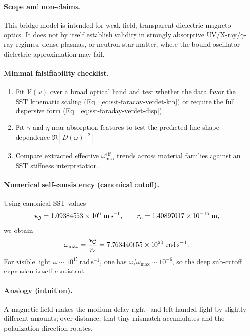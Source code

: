 \documentclass[10pt]{article}
\newcommand{\vswirl}{\mathbf{v}_{\!\boldsymbol{\circlearrowleft}}}
\begin{document}
        \paragraph{Scope and non-claims.}
            This bridge model is intended for weak-field, transparent dielectric magneto-optics. It does not by itself establish validity in strongly absorptive UV/X-ray/\(\gamma\)-ray regimes, dense plasmas, or neutron-star matter, where the bound-oscillator dielectric approximation may fail.

        \paragraph{Minimal falsifiability checklist.}
            \begin{enumerate}
                \item Fit \(\mathcal{V}(\omega)\) over a broad optical band and test whether the data favor the SST kinematic scaling (Eq.~\eqref{eq:sst-faraday-verdet-kin}) or require the full dispersive form (Eq.~\eqref{eq:sst-faraday-verdet-disp}).
                \item Fit \(\gamma\) and \(\eta\) near absorption features to test the predicted line-shape dependence \(\Re[D(\omega)^{-2}]\).
                \item Compare extracted effective \(\omega_{\max}^{\mathrm{eff}}\) trends across material families against an SST stiffness interpretation.
            \end{enumerate}

        \paragraph{Numerical self-consistency (canonical cutoff).}
            Using canonical SST values
            \[
                \vswirl = 1.09384563\times 10^6\ \mathrm{m\,s^{-1}},
                \qquad
                \rc = 1.40897017\times 10^{-15}\ \mathrm{m},
            \]
            we obtain
            \[
                \omega_{\max}=\frac{\vswirl}{\rc}=7.763440655\times 10^{20}\ \mathrm{rad\,s^{-1}}.
            \]
            For visible light \(\omega\sim 10^{15}\ \mathrm{rad\,s^{-1}}\), one has \(\omega/\omega_{\max}\sim 10^{-6}\), so the deep sub-cutoff expansion is self-consistent.

        \paragraph{Analogy (intuition).}
            A magnetic field makes the medium delay right- and left-handed light by slightly different amounts; over distance, that tiny mismatch accumulates and the polarization direction rotates.
\end{document}
